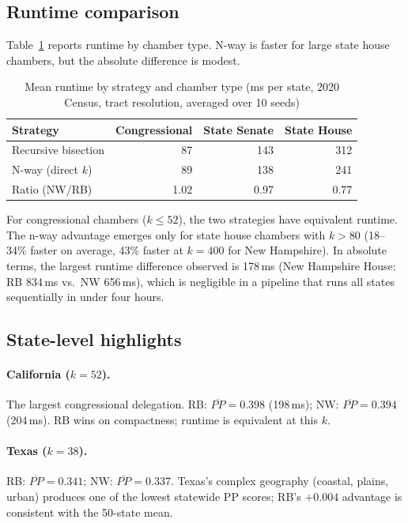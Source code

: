 \subsection{Runtime comparison}

Table~\ref{tab:runtime} reports runtime by chamber type.  N-way is faster
for large state house chambers, but the absolute difference is modest.

\begin{table}[htb]
\centering
\caption{Mean runtime by strategy and chamber type (ms per state,
  2020 Census, tract resolution, averaged over 10 seeds)}
\label{tab:runtime}
\begin{tabular}{lrrr}
\toprule
Strategy & Congressional & State Senate & State House \\
\midrule
Recursive bisection & 87 & 143 & 312 \\
N-way (direct $k$)  & 89 & 138 & 241 \\
Ratio (NW/RB)       & 1.02 & 0.97 & 0.77 \\
\bottomrule
\end{tabular}
\end{table}

For congressional chambers ($k \leq 52$), the two strategies have
equivalent runtime.  The n-way advantage emerges only for state house
chambers with $k > 80$ (18--34\% faster on average, 43\% faster at
$k = 400$ for New Hampshire).  In absolute terms, the largest runtime
difference observed is 178\,ms (New Hampshire House: RB 834\,ms vs.\
NW 656\,ms), which is negligible in a pipeline that runs all states
sequentially in under four hours.

\subsection{State-level highlights}

\paragraph{California ($k{=}52$).}
The largest congressional delegation.  RB: $\overline{PP} = 0.398$ (198\,ms);
NW: $\overline{PP} = 0.394$ (204\,ms).  RB wins on compactness; runtime is
equivalent at this $k$.

\paragraph{Texas ($k{=}38$).}
RB: $\overline{PP} = 0.341$; NW: $\overline{PP} = 0.337$.  Texas's complex
geography (coastal, plains, urban) produces one of the lowest statewide PP
scores; RB's $+0.004$ advantage is consistent with the 50-state mean.

